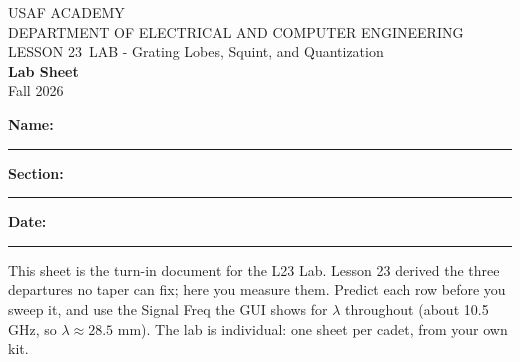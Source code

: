 \documentclass{exam}
\def\labLesson{23}
\def\thisterm{\thisTermIn}
\def\thisterm{Fall 2026}
\begin{document}
\pagestyle{headandfoot}   %



\begin{center}
USAF ACADEMY \\
DEPARTMENT OF ELECTRICAL AND COMPUTER ENGINEERING \\
LESSON \labLesson\ LAB - Grating Lobes, Squint, and Quantization \\
\textbf{Lab Sheet} \\
\thisterm \\[4mm]
\end{center}

\vspace{-4pt}
\textbf{Name:} \rule[-2pt]{2.6in}{0.4pt} \hfill
\textbf{Section:} \rule[-2pt]{0.9in}{0.4pt} \hfill
\textbf{Date:} \rule[-2pt]{1.1in}{0.4pt}

\vspace{4pt}


\vspace{2pt}

This sheet is the turn-in document for the L23 Lab. Lesson 23 derived the three
departures no taper can fix; here you measure them. Predict each row before you
sweep it, and use the Signal Freq the GUI shows for $\lambda$ throughout (about
10.5 GHz, so $\lambda \approx 28.5$ mm). The lab is individual: one sheet per
cadet, from your own kit.
\end{document}
